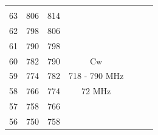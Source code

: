 \begin{longtable}[H]{|p{1cm}|p{1cm}|p{1cm}|cc|cc|}
                  \multicolumn{1}{c|}{\cellcolor[HTML]{34FF34}} &
                   &
                   &
                   \\ \cline{1-3}
                \cellcolor[HTML]{FFCCC9}63 &
                  \cellcolor[HTML]{FFCCC9}806 &
                  \cellcolor[HTML]{FFCCC9}814 &
                  \multicolumn{1}{c|}{\cellcolor[HTML]{34FF34}} &
                   &
                   &
                   \\ \cline{1-3}
                \cellcolor[HTML]{FFCCC9}62 &
                  \cellcolor[HTML]{FFCCC9}798 &
                  \cellcolor[HTML]{FFCCC9}806 &
                  \multicolumn{1}{c|}{\cellcolor[HTML]{34FF34}} &
                   &
                   &
                   \\ \cline{1-3}
                \cellcolor[HTML]{FFCCC9}61 &
                  \cellcolor[HTML]{FFCCC9}790 &
                  \cellcolor[HTML]{FFCCC9}798 &
                  \multicolumn{1}{c|}{\cellcolor[HTML]{34FF34}} &
                   &
                   &
                   \\ \cline{1-4}
                \cellcolor[HTML]{9AFF99}60 &
                  \cellcolor[HTML]{9AFF99}782 &
                  \cellcolor[HTML]{9AFF99}790 &
                  \multicolumn{1}{c|}{\cellcolor[HTML]{38FFF8}Cw} &
                   &
                   &
                   \\ \cline{1-3}
                \cellcolor[HTML]{9AFF99}59 &
                  \cellcolor[HTML]{9AFF99}774 &
                  \cellcolor[HTML]{9AFF99}782 &
                  \multicolumn{1}{c|}{\cellcolor[HTML]{38FFF8}718 - 790 MHz} &
                   &
                   &
                   \\ \cline{1-3}
                \cellcolor[HTML]{9AFF99}58 &
                  \cellcolor[HTML]{9AFF99}766 &
                  \cellcolor[HTML]{9AFF99}774 &
                  \multicolumn{1}{c|}{\cellcolor[HTML]{38FFF8}72 MHz} &
                   &
                   &
                   \\ \cline{1-3}
                \cellcolor[HTML]{9AFF99}57 &
                  \cellcolor[HTML]{9AFF99}758 &
                  \cellcolor[HTML]{9AFF99}766 &
                  \multicolumn{1}{c|}{\cellcolor[HTML]{38FFF8}} &
                   &
                   &
                   \\ \cline{1-3}
                \cellcolor[HTML]{9AFF99}56 &
                  \cellcolor[HTML]{9AFF99}750 &
                  \cellcolor[HTML]{9AFF99}758 &

\end{longtable}
